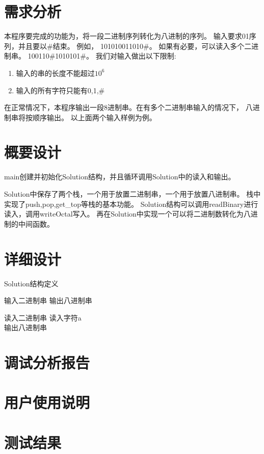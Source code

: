 \section{需求分析}

本程序要完成的功能为，将一段二进制序列转化为八进制的序列。
输入要求01序列，并且要以\#结束。
例如，
101010011010\#。
如果有必要，可以读入多个二进制串。
100110\#1010101\#。
我们对输入做出以下限制:
\begin{enumerate}
   \item 输入的串的长度不能超过$10^6$
   \item 输入的所有字符只能有0,1,\#
\end{enumerate}


在正常情况下，本程序输出一段8进制串。在有多个二进制串输入的情况下，
八进制串将按顺序输出。
以上面两个输入样例为例。



\section{概要设计}
   main创建并初始化Solution结构，并且循环调用Solution中的读入和输出。


   Solution中保存了两个栈，一个用于放置二进制串，一个用于放置八进制串。
   栈中实现了push,pop,get\_top等栈的基本功能。
   Solution结构可以调用readBinary进行读入，调用writeOctal写入。
   再在Solution中实现一个可以将二进制数转化为八进制的中间函数。

\section{详细设计}

\begin{algorithm}[htb] 
   \caption{ Solution结构定义 } 
   \label{alg:Framwork} 
   \begin{algorithmic}[1]
      \Require 输入二进制串
      \Ensure 输出八进制串
      
      \State 读入二进制串
         \State 读入字符a
            \If {}
            \EndIf
         \EndWhile
      \EndFunction \\

      \State 输出八进制串
         
      \EndFunction

      
         
      \EndFunction
   \end{algorithmic} 
\end{algorithm}

\section{调试分析报告}

\section{用户使用说明}

\section{测试结果}


